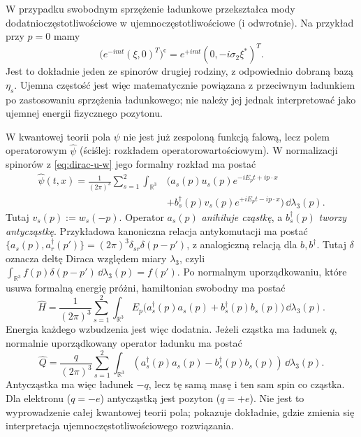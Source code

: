 W przypadku swobodnym sprzężenie ładunkowe
przekształca mody dodatnioczęstotliwościowe
w ujemnoczęstotliwościowe (i odwrotnie).
Na przykład przy $p=0$ mamy
\[
 \bigl(e^{-imt}(\xi,0)^T\bigr)^{\mathrm c}
 =e^{+imt}(0,-i\sigma_2\xi^*)^T.
\]
Jest to dokładnie jeden ze spinorów drugiej rodziny,
z odpowiednio dobraną bazą $\eta_s$.
Ujemna częstość jest więc matematycznie
powiązana z przeciwnym ładunkiem po
zastosowaniu sprzężenia ładunkowego;
nie należy jej jednak interpretować
jako ujemnej energii fizycznego pozytonu.

\begin{uwaga}
\label{rem:dirac-kwantowanie}
W kwantowej teorii pola $\psi$ nie jest już
zespoloną funkcją falową, lecz polem operatorowym
$\widehat\psi$ (ściślej: rozkładem
operatorowartościowym). W normalizacji spinorów z
\eqref{eq:dirac-u-w} jego formalny rozkład ma postać
\begin{equation}\label{eq:dirac-operator-pola}
 \begin{aligned}
\widehat\psi(t,x)
 =\frac1{(2\pi)^3}\sum_{s=1}^2
 \int_{\mathbb R^3}&\bigl(
 a_s(p)u_s(p)e^{-iE_pt+ip\cdot x}\\
 &+b_s^\dagger(p)v_s(p)e^{+iE_pt-ip\cdot x}
 \bigr)\,\dd\lambda_3(p).
\end{aligned}
\end{equation}
Tutaj $v_s(p):=w_s(-p)$.
Operator $a_s(p)$ \emph{anihiluje cząstkę},
a $b_s^\dagger(p)$ \emph{tworzy antycząstkę}.
Przykładowa kanoniczna relacja antykomutacji ma postać
$\{a_s(p),a_r^\dagger(p')\}
=(2\pi)^3\delta_{sr}\delta(p-p')$,
z analogiczną relacją dla $b,b^\dagger$. Tutaj
$\delta$ oznacza deltę Diraca względem miary
$\lambda_3$, czyli
$\int_{\mathbb R^3}f(p)\delta(p-p')\,\dd\lambda_3(p)=f(p')$.
Po normalnym uporządkowaniu, które usuwa
formalną energię próżni, hamiltonian swobodny ma postać
\[
 \widehat H=\frac1{(2\pi)^3}\sum_{s=1}^2
 \int_{\mathbb R^3}E_p\bigl(a_s^\dagger(p)a_s(p)
          +b_s^\dagger(p)b_s(p)\bigr)\,\dd\lambda_3(p).
\]
Energia każdego wzbudzenia jest więc dodatnia.
Jeżeli cząstka ma ładunek $q$, normalnie
uporządkowany operator ładunku ma postać
\[
 \widehat Q=\frac q{(2\pi)^3}\sum_{s=1}^2
 \int_{\mathbb R^3}(a_s^\dagger(p)a_s(p)
 -b_s^\dagger(p)b_s(p))\,\dd\lambda_3(p).
\]
Antycząstka ma więc ładunek $-q$, lecz tę samą masę
i ten sam spin co cząstka.
Dla elektronu ($q=-e$) antycząstką jest pozyton
($q=+e$).
Nie jest to wyprowadzenie całej kwantowej teorii pola;
pokazuje dokładnie, gdzie zmienia się interpretacja
ujemnoczęstotliwościowego rozwiązania.
\end{uwaga}

